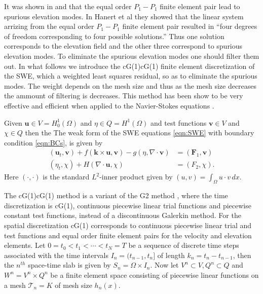 It was shown in \cite{Hanert2002} and \cite{Le-Roux1998} that the equal order
$P_1-P_1$ finite element pair lead to spurious elevation modes. In Hanert et al
\cite{Hanert2002} they showed that the linear system arrizing from the equal
order $P_1-P_1$ finite element pair resulted in ``four degrees of freedom
corresponding to four possible solutions.'' Thus one solution corresponds to the
elevation field and the other three correspond to spurious elevation modes. To
eliminate the spurious elevation modes one should filter them out. In what
follows we introduce the cG(1)cG(1) finite element discretization of the SWE,
which a weighted least squares residual, so as to eliminate the spurious modes.
The weight depends on the mesh size and thus as the mesh size decreases the
ammount of filtering is decreases. This method has been show to be very
effective and efficient when applied to the Navier-Stokes equations
\cite{Hoffman2003,Hoffman2006a,Hoffman2006b,Hoffman2011,Jansson2011}.

Given $\mathbf{u} \in V=H^1_0(\Omega)$ and $\eta \in Q=H^1(\Omega)$ and
test functions $\mathbf{v} \in V$ and $\chi \in Q$ then the The weak form of the
SWE equations \eqref{eqn:SWE} with boundary condition \eqref{eqn:BCs}, is given
by
\begin{equation}
  \begin{split}
    (\mathbf{u}_t, \mathbf{v}) + f(\mathbf{k} \times
        \mathbf{u}, \mathbf{v}) - g (\eta, \nabla\cdot \mathbf{v}) 
        &= (\mathbf{F}_1,\mathbf{v})\\
    (\eta_t, \chi) + H (\nabla\cdot \mathbf{u},\chi) &= (F_2,\chi).
  \end{split}
  \label{eqn:WeakSWE}
\end{equation}
Here $(\cdot, \cdot)$ is the standard $L^2$-inner product given by $(u,v) =
\int_{\Omega}\! u\cdot v\, dx$.

The cG(1)cG(1) method is a variant of the G2 method \cite{Johnson1998}, where
the time discretization is cG(1), continuous piecewise linear trial functions
and piecewise constant test functions, instead of a discontinuous Galerkin
method. For the spatial discretization cG(1) corresponds to continuous piecewise
linear trial and test functions and equal order finite element pairs for the
velocity and elevation elements. Let $0 = t_0 < t_1 < \cdots < t_N = T$ be a
sequence of discrete time steps associated with the time intervals $I_n =
(t_{n-1},t_n]$ of length $k_n = t_n - t_{n-1}$, then the $n^{th}$
space-time slab is given by $S_n = \Omega \times I_n$. Now let $V^n \subset V,
Q^n \subset Q$ and $W^n = V^n \times Q^n$ be a finite element space consisting
of piecewise linear functions on a mesh $\mathcal{T}_n = {K}$ of mesh size
$h_n(x)$.

